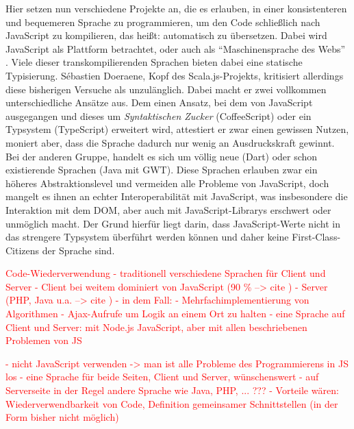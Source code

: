 \documentclass[a4paper, 12pt, hidelinks, listof=totoc, listoftables=totoc, bibliography=totoc]{scrreprt}
\newcommand{\TODO}[1]{\textcolor{red}{#1}\newline}
\begin{document}
Hier setzen nun verschiedene Projekte an, die es erlauben, in einer konsistenteren und bequemeren Sprache zu programmieren, um den Code schließlich nach JavaScript zu kompilieren, das heißt: automatisch zu übersetzen. Dabei wird JavaScript als Plattform betrachtet, oder auch als "`Maschinensprache des Webs"' \cite{meijer2011.JLA}. Viele dieser transkompilierenden Sprachen bieten dabei eine statische Typisierung. Sébastien Doeraene, Kopf des Scala.js-Projekts, kritisiert allerdings diese bisherigen Versuche als unzulänglich. Dabei macht er zwei vollkommen unterschiedliche Ansätze aus. Dem einen Ansatz, bei dem von \mbox{JavaScript} ausgegangen und dieses um \textit{Syntaktischen Zucker} (CoffeeScript) oder ein Typsystem (TypeScript) erweitert wird, attestiert er zwar einen gewissen Nutzen, moniert aber, dass die Sprache dadurch nur wenig an Ausdruckskraft gewinnt. Bei der anderen Gruppe, handelt es sich um völlig neue (Dart) oder schon existierende Sprachen (Java mit GWT). Diese Sprachen erlauben zwar ein höheres Abstraktionslevel und vermeiden alle Probleme von JavaScript, doch mangelt es ihnen an echter Interoperabilität mit \mbox{JavaScript}, was insbesondere die Interaktion mit dem \ac{DOM}, aber auch mit JavaScript-Librarys erschwert oder unmöglich macht. Der Grund hierfür liegt darin, dass JavaScript-Werte nicht in das strengere Typsystem überführt werden können und daher keine First-Class-Citizens der Sprache sind.\cite[S. 1]{doeraene2013.TDI}



















\TODO{Code-Wiederverwendung}
\TODO{- traditionell verschiedene Sprachen für Client und Server}
\TODO{	- Client bei weitem dominiert von JavaScript (90 \% --> cite%
)}
\TODO{	- Server (PHP, Java u.a. --> cite %
)}
\TODO{- in dem Fall:}
\TODO{	- Mehrfachimplementierung von Algorithmen}
\TODO{	- Ajax-Aufrufe um Logik an einem Ort zu halten}
\TODO{- eine Sprache auf Client und Server: mit Node.js JavaScript, aber mit allen beschriebenen Problemen von JS}




\TODO{- nicht JavaScript verwenden -> man ist alle Probleme des Programmierens in JS los}
\TODO{- eine Sprache für beide Seiten, Client und Server, wünschenswert}
\TODO{  - auf Serverseite in der Regel andere Sprache wie Java, PHP, ... ???}
\TODO{  - Vorteile wären: Wiederverwendbarkeit von Code, Definition gemeinsamer Schnittstellen (in der Form bisher nicht möglich)}
\end{document}
